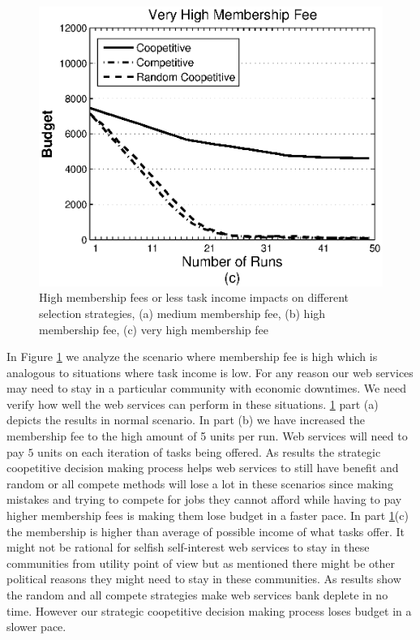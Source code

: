 \documentclass[fleqn]{singlecol-new}
\begin{document}
\begin{figure}
\includegraphics[scale=0.302]{graphbgtveryhigh.eps}
\caption{High membership fees or less task income impacts on different selection strategies, (a) medium membership fee, (b) high membership fee, (c) very high membership fee} \label{membership_fee_graph}
\end{figure}

In Figure \ref{membership_fee_graph} we analyze the scenario where membership fee is high which is analogous to situations where task income is low. For any reason our web services may need to stay in a particular community with economic downtimes. We need verify how well the web services can perform in these situations. \ref{membership_fee_graph} part (a) depicts the results in normal scenario. In part (b) we have increased the membership fee to the high amount of 5 units per run. Web services will need to pay $5$ units on each iteration of tasks being offered. As results the strategic coopetitive decision making process helps web services to still have benefit and random or all compete methods will lose a lot in these scenarios since making mistakes and trying to compete for jobs they cannot afford while having to pay higher membership fees is making them lose budget in a faster pace. In part \ref{membership_fee_graph}(c) the membership is higher than average of possible income of what tasks offer. It might not be rational for selfish self-interest web services to stay in these communities from utility point of view but as mentioned there might be other political reasons they might need to stay in these communities. As results show the random and all compete strategies make web services bank deplete in no time. However our strategic coopetitive decision making process loses budget in a slower pace.
\end{document}
